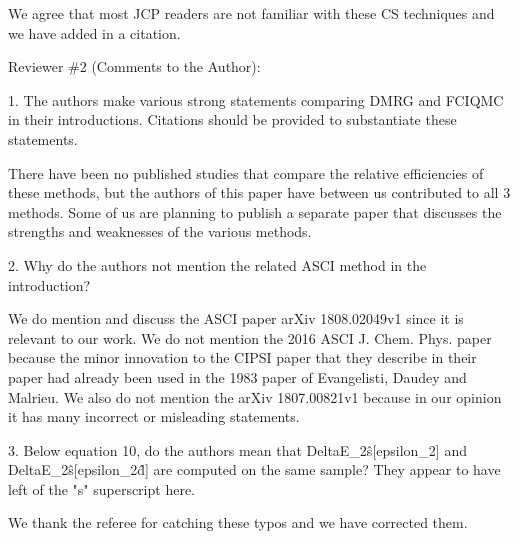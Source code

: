 \documentclass[
reprint,
 superscriptaddress,
 amsmath,amssymb,
 aps,
]{revtex4-1}
\begin{document}
We agree that most JCP readers are not familiar with these CS techniques and we have added in a citation.


{\color{blue}

Reviewer \#2 (Comments to the Author):

}\color{black}

{\color{blue}

1. The authors make various strong statements comparing DMRG and FCIQMC in their introductions. Citations should be provided to substantiate these statements.
}\color{black}

There have been no published studies that compare the relative efficiencies of these methods, but the authors of this paper have
between us contributed to all 3 methods.  Some of us are planning to publish a separate paper that discusses the strengths and weaknesses
of the various methods.

{\color{blue}
2. Why do the authors not mention the related ASCI method in the introduction?
}\color{black}

We do mention and discuss the ASCI paper arXiv 1808.02049v1 since it is relevant to our work.
We do not mention the 2016 ASCI J. Chem. Phys. paper because the minor innovation to the CIPSI paper that they
describe in their paper had already been used in the 1983 paper of Evangelisti, Daudey and Malrieu.
We also do not mention the arXiv 1807.00821v1 because in our opinion it has many incorrect or misleading statements.

{\color{blue}
3. Below equation 10, do the authors mean that DeltaE\_2\^s[epsilon\_2] and DeltaE\_2\^s[epsilon\_2\^d] are computed on the same sample? They appear to have left of the "s" superscript here.
}\color{black}

We thank the referee for catching these typos and we have corrected them.
\end{document}
